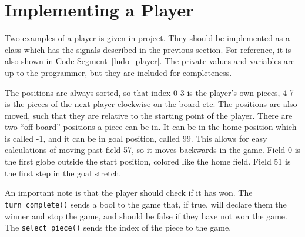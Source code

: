 \documentclass[a4paper,10pt]{article}
\renewcommand\lstlistingname{Code Segment}
\begin{document}
\section{Implementing a Player}
Two examples of a player is given in project.
They should be implemented as a class which has the signals described in the previous section.
For reference, it is also shown in \lstlistingname~\ref{ludo_player}.
The private values and variables are up to the programmer, but they are included for completeness.

The positions are always sorted, so that index 0-3 is the player's own pieces, 4-7 is the pieces of the next player clockwise on the board etc.
The positions are also moved, such that they are relative to the starting point of the player.
There are two ``off board'' positions a piece can be in.
It can be in the home position which is called -1, and it can be in goal position, called 99.
This allows for easy calculations of moving past field 57, so it moves backwards in the game.
Field 0 is the first globe outside the start position, colored like the home field.
Field 51 is the first step in the goal stretch.

An important note is that the player should check if it has won.
The \verb|turn_complete()| sends a bool to the game that, if true, will declare them the winner and stop the game, and should be false if they have not won the game.
The \verb|select_piece()| sends the index of the piece to the game.


\end{document}
